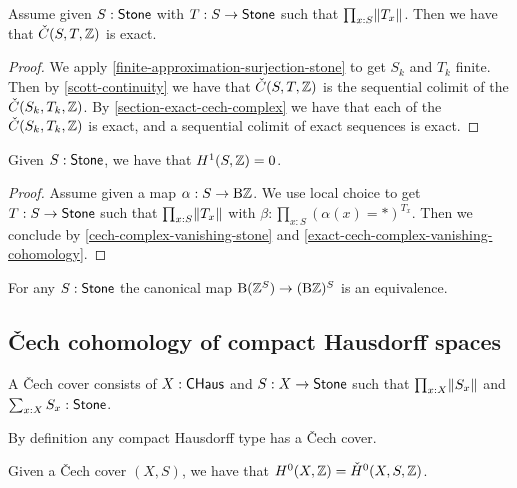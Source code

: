 \begin{lemma}\label{cech-complex-vanishing-stone}
Assume given $S:\mathsf{Stone}$ with $T:S\to\mathsf{Stone}$ such that $\prod_{x:S}\lVert T_x \rVert$. Then we have that $\check{C}(S,T,\mathbb{Z})$ is exact.
\end{lemma}


\begin{proof}
We apply \cref{finite-approximation-surjection-stone} to get $S_k$ and $T_k$ finite. Then by \cref{scott-continuity} we have that $\check{C}(S,T,\mathbb{Z})$ is the sequential colimit of the $\check{C}(S_k,T_k,\mathbb{Z})$. By \cref{section-exact-cech-complex} we have that each of the $\check{C}(S_k,T_k,\mathbb{Z})$ is exact, and a sequential colimit of exact sequences is exact.
\end{proof}

\begin{lemma}\label{eilenberg-stone-vanish}
Given $S:\mathsf{Stone}$, we have that $H^1(S,\mathbb{Z}) = 0$. 
\end{lemma}

\begin{proof}
Assume given a map $\alpha:S\to \mathrm{B}\mathbb{Z}$. We use local choice to get $T:S\to\mathsf{Stone}$ such that $\prod_{x:S}\lVert T_x \rVert$ with $\beta:\prod_{x:S}(\alpha(x)=*)^{T_x}$. Then we conclude by \cref{cech-complex-vanishing-stone} and \cref{exact-cech-complex-vanishing-cohomology}.
\end{proof}

\begin{corollary}\label{stone-commute-delooping}
For any $S:\mathsf{Stone}$ the canonical map $\mathrm{B}(\mathbb{Z}^S) \to (\mathrm{B}\mathbb{Z})^S$ is an equivalence.
\end{corollary}


\subsection{\v{C}ech cohomology of compact Hausdorff spaces}

\begin{definition}
A \v{C}ech cover consists of $X:\mathsf{CHaus}$ and $S:X\to\mathsf{Stone}$ such that $\prod_{x:X}\lVert S_x \rVert$ and $\sum_{x:X}S_x:\mathsf{Stone}$.
\end{definition}

By definition any compact Hausdorff type has a \v{C}ech cover.

\begin{lemma}\label{cech-eilenberg-0-agree}
Given a \v{C}ech cover $(X,S)$, we have that $H^0(X,\mathbb{Z}) = \check{H}^0(X,S,\mathbb{Z})$.
\end{lemma}

